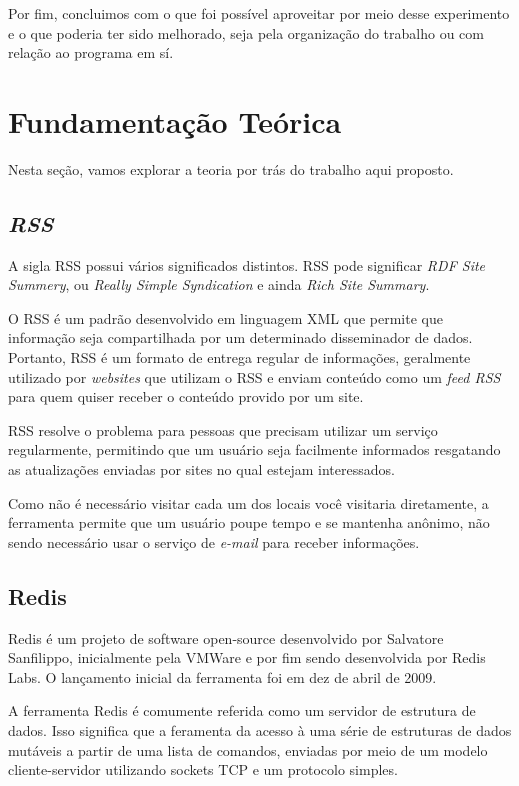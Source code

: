 \documentclass[10pt]{IEEEtran}
\begin{document}
Por fim, concluimos com o que foi possível aproveitar por meio desse experimento e o que poderia ter sido melhorado, seja pela organização do trabalho ou com relação ao programa em sí.

\section{Fundamentação Teórica}
Nesta seção, vamos explorar a teoria por trás do trabalho aqui proposto.

\subsection{\textit{RSS}}

A sigla RSS possui vários significados distintos. RSS pode significar \textit{RDF Site Summery}, ou \textit{Really Simple Syndication} e ainda \textit{Rich Site Summary}.

O RSS é um padrão desenvolvido em linguagem XML que permite que informação seja compartilhada por um determinado disseminador de dados. Portanto, RSS é um formato de entrega regular de informações, geralmente utilizado por \textit{websites} que utilizam o RSS e enviam conteúdo como um \textit{feed RSS} para quem quiser receber o conteúdo provido por um site.

RSS resolve o problema para pessoas que precisam utilizar um serviço regularmente, permitindo que um usuário seja facilmente informados resgatando as atualizações enviadas por sites no qual estejam interessados.

Como não é necessário visitar cada um dos locais você visitaria diretamente, a ferramenta permite que um usuário poupe tempo e se mantenha anônimo, não sendo necessário usar o serviço de \textit{e-mail} para receber informações.

\subsection{Redis}

Redis é um projeto de software open-source desenvolvido por Salvatore Sanfilippo, inicialmente pela VMWare e por fim sendo desenvolvida por Redis Labs. O lançamento inicial da ferramenta foi em dez de abril de 2009.

A ferramenta Redis é comumente referida como um servidor de estrutura de dados. Isso significa que a feramenta da acesso à uma série de estruturas de dados mutáveis a partir de uma lista de comandos, enviadas por meio de um modelo cliente-servidor utilizando sockets TCP e um protocolo simples.
\end{document}
